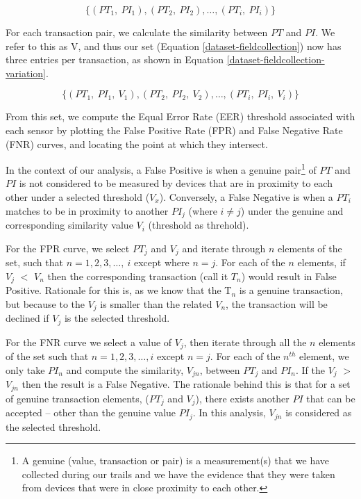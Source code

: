 \documentclass{article}
\begin{document}
\begin{equation}
\{(PT_{1},~PI_{1}),(PT_{2},~PI_{2}), \dots, (PT_{i},~PI_{i})\}
\label{dataset-fieldcollection}
\end{equation}

For each transaction pair, we calculate the similarity between $PT$ and $PI$.  We refer to this as V, and thus our set (Equation \ref{dataset-fieldcollection}) now has three entries per transaction, as shown in Equation \ref{dataset-fieldcollection-variation}.

\begin{equation}
\{(PT_{1},~PI_{1},~V_1),(PT_{2},~PI_{2},~V_2), \dots, (PT_{i},~PI_{i},~V_i)\}
\label{dataset-fieldcollection-variation}
\end{equation}

From this set, we compute the Equal Error Rate (EER) threshold associated with each sensor by plotting the False Positive Rate (FPR) and False Negative Rate (FNR) curves, and locating the point at which they intersect.  

In the context of our analysis, a False Positive is when a genuine pair\footnote{A genuine (value, transaction or pair) is a measurement(s) that we have collected during our trails and we have the evidence that they were taken from devices that were in close proximity to each other.} of $PT$ and $PI$ is not considered to be measured by devices that are in proximity to each other under a selected threshold ($V_x$).  Conversely, a False Negative is when a $PT_{i}$ matches to be in proximity to another $PI_{j}$ (where $i \neq j$) under the genuine and corresponding similarity value $V_i$ (threshold as threhold). 



For the FPR curve, we select $PT_j$ and $V_{j}$ and iterate through $n$ elements of the set, such that $n=1, 2, 3, \dots,~i$ except where $n = j$.  For each of the $n$ elements, if $V_j$ $<$ $V_n$ then the corresponding transaction (call it $T_n$) would result in False Positive. Rationale for this is, as we know that the T$_n$ is a genuine transaction, but because to the $V_j$ is smaller than the related $V_n$, the transaction will be declined if $V_j$ is the selected threshold.

For the FNR curve we select a value of $V_j$, then iterate through all the $n$ elements of the set such that $n=1, 2, 3, \dots,  i$ except $n = j$. For each of the $n^{th}$ element, we only take $PI_n$ and compute the similarity, $V_{jn}$, between $PT_j$ and $PI_n$. If the $V_{j}$ $>$ $V_{jn}$ then the result is a False Negative. The rationale behind this is that for a set of genuine transaction elements, ($PT_{j}$ and $V_{j}$), there exists another $PI$ that can be accepted -- other than the genuine value $PI_{j}$.   In this analysis, $V_{jn}$ is considered as the selected threshold.
\end{document}
